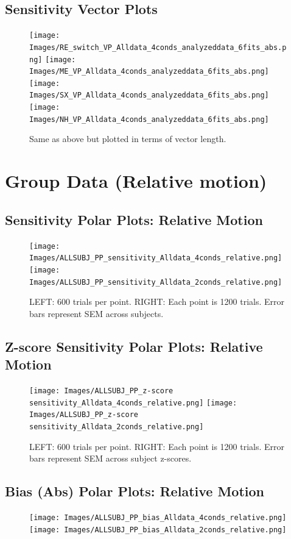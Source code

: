 \documentclass[11pt]{article} %
\begin{document}
\subsection{Sensitivity Vector Plots}
\begin{figure}[H]
\centering %
\texttt{[image: Images/RE\_switch\_VP\_Alldata\_4conds\_analyzeddata\_6fits\_abs.png]}
\texttt{[image: Images/ME\_VP\_Alldata\_4conds\_analyzeddata\_6fits\_abs.png]}
\texttt{[image: Images/SX\_VP\_Alldata\_4conds\_analyzeddata\_6fits\_abs.png]}
\texttt{[image: Images/NH\_VP\_Alldata\_4conds\_analyzeddata\_6fits\_abs.png]}
\caption{Same as above but plotted in terms of vector length.}
\end{figure}

\newpage
\section{Group Data (Relative motion)}
\subsection{Sensitivity Polar Plots: Relative Motion}
\begin{figure}[H]
\centering %
\texttt{[image: Images/ALLSUBJ\_PP\_sensitivity\_Alldata\_4conds\_relative.png]}
\texttt{[image: Images/ALLSUBJ\_PP\_sensitivity\_Alldata\_2conds\_relative.png]}
\caption{LEFT: 600 trials per point. RIGHT: Each point is 1200 trials. Error bars represent SEM across subjects.}
\end{figure}
\subsection{Z-score Sensitivity Polar Plots: Relative Motion}
\begin{figure}[H]
\centering %
\texttt{[image: Images/ALLSUBJ\_PP\_z-score sensitivity\_Alldata\_4conds\_relative.png]}
\texttt{[image: Images/ALLSUBJ\_PP\_z-score sensitivity\_Alldata\_2conds\_relative.png]}
\caption{LEFT: 600 trials per point. RIGHT: Each point is 1200 trials. Error bars represent SEM across subject z-scores.}
\end{figure}
\subsection{Bias (Abs) Polar Plots: Relative Motion}
\begin{figure}[H]
\centering %
\texttt{[image: Images/ALLSUBJ\_PP\_bias\_Alldata\_4conds\_relative.png]}
\texttt{[image: Images/ALLSUBJ\_PP\_bias\_Alldata\_2conds\_relative.png]}
\end{figure}
\end{document}
